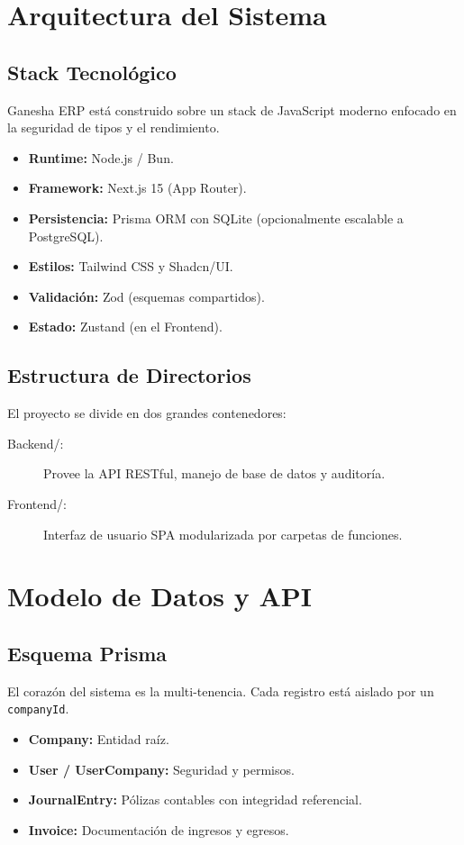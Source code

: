 \documentclass[12pt, a4paper, oneside]{book}
\begin{document}



\chapter{Arquitectura del Sistema}

\section{Stack Tecnológico}
Ganesha ERP está construido sobre un stack de JavaScript moderno enfocado en la seguridad de tipos y el rendimiento.
\begin{itemize}
    \item \textbf{Runtime:} Node.js / Bun.
    \item \textbf{Framework:} Next.js 15 (App Router).
    \item \textbf{Persistencia:} Prisma ORM con SQLite (opcionalmente escalable a PostgreSQL).
    \item \textbf{Estilos:} Tailwind CSS y Shadcn/UI.
    \item \textbf{Validación:} Zod (esquemas compartidos).
    \item \textbf{Estado:} Zustand (en el Frontend).
\end{itemize}

\section{Estructura de Directorios}
El proyecto se divide en dos grandes contenedores:
\begin{description}
    \item[Backend/:] Provee la API RESTful, manejo de base de datos y auditoría.
    \item[Frontend/:] Interfaz de usuario SPA modularizada por carpetas de funciones.
\end{description}

\chapter{Modelo de Datos y API}

\section{Esquema Prisma}
El corazón del sistema es la multi-tenencia. Cada registro está aislado por un \texttt{companyId}.
\begin{tcolorbox}[colback=white, colframe=DevBlue, title=Entidades Principales]
    \begin{itemize}
        \item \textbf{Company:} Entidad raíz.
        \item \textbf{User / UserCompany:} Seguridad y permisos.
        \item \textbf{JournalEntry:} Pólizas contables con integridad referencial.
        \item \textbf{Invoice:} Documentación de ingresos y egresos.
    \end{itemize}
\end{tcolorbox}
\end{document}
